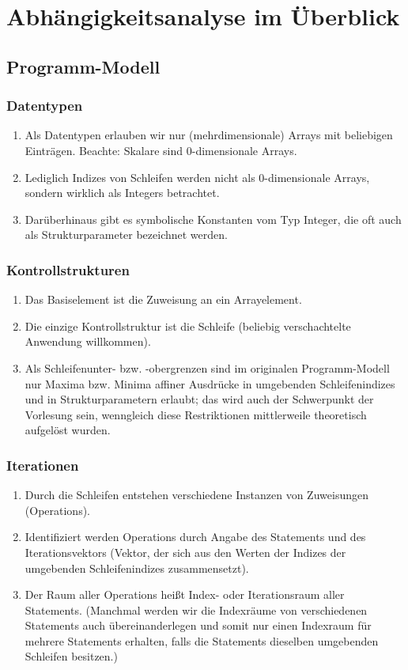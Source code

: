 
\section{Abhängigkeitsanalyse im Überblick}
\subsection{Programm-Modell}

\subsubsection{Datentypen}
\begin{enumerate}
  \item Als Datentypen erlauben wir nur (mehrdimensionale) Arrays mit beliebigen Einträgen.
    Beachte: Skalare sind 0-dimensionale Arrays.
  \item Lediglich Indizes von Schleifen werden nicht als 0-dimensionale Arrays, sondern wirklich als Integers betrachtet.
  \item Darüberhinaus gibt es symbolische Konstanten vom Typ Integer, die oft auch als Strukturparameter bezeichnet werden.
\end{enumerate}

\subsubsection{Kontrollstrukturen}
\begin{enumerate}
  \item Das Basiselement ist die Zuweisung an ein Arrayelement.
  \item Die einzige Kontrollstruktur ist die Schleife (beliebig verschachtelte Anwendung willkommen).
  \item Als Schleifenunter- bzw. -obergrenzen sind im originalen Programm-Modell nur Maxima bzw. Minima affiner Ausdrücke in umgebenden Schleifenindizes und in Strukturparametern erlaubt; das wird auch der Schwerpunkt der Vorlesung sein, wenngleich diese Restriktionen mittlerweile theoretisch aufgelöst wurden.
\end{enumerate}

\subsubsection{Iterationen}
  \begin{enumerate}
  \item Durch die Schleifen entstehen verschiedene Instanzen von Zuweisungen (Operations).
  \item Identifiziert werden Operations durch Angabe des Statements und des Iterationsvektors (Vektor, der sich aus den Werten der Indizes der umgebenden Schleifenindizes zusammensetzt).
  \item Der Raum aller Operations heißt Index- oder Iterationsraum aller Statements.
    (Manchmal werden wir die Indexräume von verschiedenen Statements auch übereinanderlegen und somit nur einen Indexraum für mehrere Statements erhalten,
    falls die Statements dieselben umgebenden Schleifen besitzen.)
\end{enumerate}

